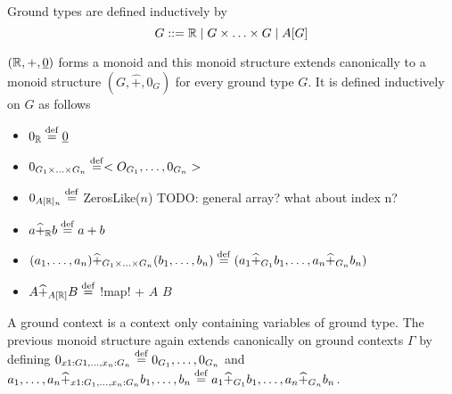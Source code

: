 Ground types are defined inductively by 
$$G::= \mathbb{R} \mid G\times \ldots \times G \mid A[G]$$

$(\mathbb{R},+,\underline{0})$ forms a monoid and this monoid structure extends canonically 
to a monoid structure $(G,\widehat{+},0_G)$ for every ground type $G$. 
It is defined inductively on $G$ as follows
\begin{itemize}
    \item $0_{\mathbb{R}} \stackrel {\mathrm{def}}= \underline{0}$
    \item $0_{G_1\times \ldots \times G_n}\stackrel {\mathrm{def}}= < O_{G_1},\ldots, 0_{G_n} >$
    \item $0_{A[\mathbb{R}]_n}\stackrel {\mathrm{def}}=$ ZerosLike($n$) TODO: general array? what about index n?
    \item $a\widehat{+}_{\mathbb{R}} b\stackrel {\mathrm{def}}= a+b$
    \item $(a_1,\ldots,a_n)\widehat{+}_{G_1\times\ldots\times G_n}(b_1,\ldots,b_n)\stackrel {\mathrm{def}}= (a_1\widehat{+}_{G_1}b_1,\ldots,a_n\widehat{+}_{G_n}b_n)$
    \item $A\widehat{+}_{A[\mathbb{R}]}B \stackrel {\mathrm{def}}=$ !map! + $A$ $B$
\end{itemize}

A ground context is a context only containing variables of ground type.
The previous monoid structure again extends canonically on ground contexts $\Gamma$ by defining
$0_{x1:G1,\ldots,x_n:G_n}\stackrel {\mathrm{def}}= 0_{G_1},\ldots,0_{G_n}$ and 
$a_1,\ldots,a_n\widehat{+}_{x1:G_1,\ldots, x_n:G_n}b_1,\ldots,b_n\stackrel {\mathrm{def}}= a_1\widehat{+}_{G_1}b_1,\ldots,a_n\widehat{+}_{G_n}b_n$.


